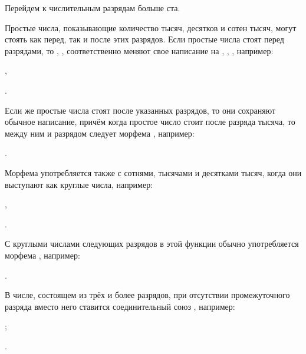 Перейдем к числительным разрядам больше ста.

Простые числа, показывающие количество тысяч, десятков и сотен тысяч, могут стоять как перед, так и после этих разрядов. Если простые числа стоят перед разрядами, то , ,  соответственно меняют свое написание на , , , например:
\begin{prfsample}
    \item {},
    \item {}.
\end{prfsample}
Если же простые числа стоят после указанных разрядов, то они сохраняют обычное написание, причём когда простое число стоит после разряда тысяча, то между ним и разрядом следует морфема , например:
\begin{prfsample}
    \item {}.
\end{prfsample}
Морфема  употребляется также с сотнями, тысячами и десятками тысяч, когда они выступают как круглые числа, например:
\begin{prfsample}
    \item {},
    \item {}.
\end{prfsample}
С круглыми числами следующих разрядов в этой функции обычно употребляется морфема , например:
\begin{prfsample}
    \item {}.
\end{prfsample}

В числе, состоящем из трёх и более разрядов, при отсутствии промежуточного разряда вместо него ставится соединительный союз , например:
\begin{prfsample}
    \item {};
    \item {}.
\end{prfsample}

